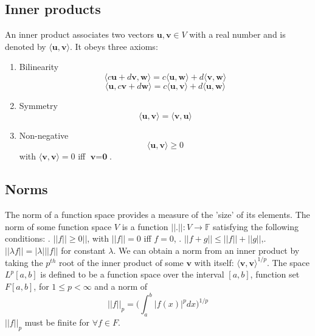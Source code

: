 \documentclass[]{article}
\begin{document}
\subsection{Inner products}
An inner product associates two vectors $\textbf{u}, \textbf{v} \in V$ with a real number and is denoted by $\langle \textbf{u}, \textbf{v} \rangle$. It obeys three axioms:
\begin{enumerate}
	\item Bilinearity \begin{equation} \langle c\textbf{u}+d\textbf{v}, \textbf{w} \rangle = c\langle \textbf{u}, \textbf{w}  \rangle + d\langle \textbf{v} , \textbf{w} \rangle \end{equation}
	\begin{equation} \langle \textbf{u},c\textbf{v}+ d\textbf{w} \rangle = c\langle \textbf{u}, \textbf{v}  \rangle + d\langle \textbf{u} , \textbf{w} \rangle \end{equation}
	\item Symmetry \begin{equation} \langle \textbf{u},\textbf{v} \rangle = \langle \textbf{v},\textbf{u} \rangle \end{equation}
	\item Non-negative \begin{equation} \langle \textbf{u},\textbf{v} \rangle \geq 0 \end{equation}
	with $\langle \textbf{v},\textbf{v} \rangle = 0$ iff $\textbf{v} = \textbf{0}$.
\end{enumerate}

\subsection{Norms}
The norm of a function space provides a measure of the 'size' of its elements. The norm of some function space $V$ is a function $||.||: V \longrightarrow \mathbb{F}$ satisfying the following conditions:
\newline
{}. $||f|| \geq 0||$, with $||f|| = 0$ iff $f=0$, . $||f+g|| \leq ||f|| + ||g||$,. $||\lambda f|| = |\lambda|||f||$ for constant $\lambda$.
\newline
\newline
We can obtain a norm from an inner product by taking the $p^{th}$ root of the inner product of some $\textbf{v}$ with itself: $\langle \textbf{v},\textbf{v} \rangle^{1/p}$.
\newline
\newline
The space $L^{p}[a,b]$ is defined to be a function space over the interval $[a,b]$, function set $F[a,b]$, for $1 \leq p < \infty$ and a norm of
\begin{equation} ||f||_{p} = \bigg( \int_{a}^{b} |f(x)|^{p}dx  \bigg)^{1/p} \end{equation}
$||f||_{p}$ must be finite for $\forall f \in F$.
\end{document}
